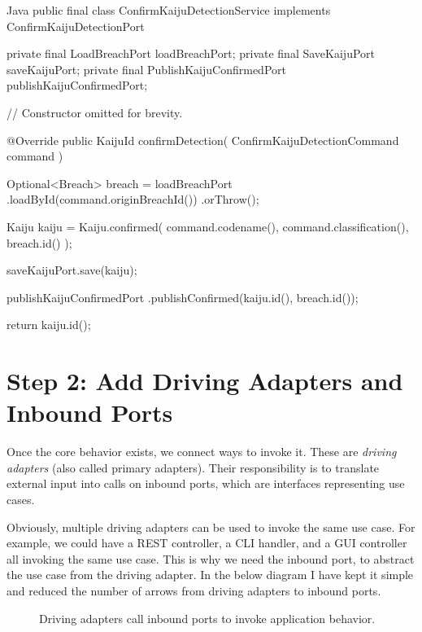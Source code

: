 \begin{ridercode}{Java}
public final class ConfirmKaijuDetectionService
    implements ConfirmKaijuDetectionPort
{
    private final LoadBreachPort loadBreachPort;
    private final SaveKaijuPort saveKaijuPort;
    private final PublishKaijuConfirmedPort
        publishKaijuConfirmedPort;

    // Constructor omitted for brevity.

    @Override
    public KaijuId confirmDetection(
        ConfirmKaijuDetectionCommand command
    )
    {
        Optional<Breach> breach = loadBreachPort
            .loadById(command.originBreachId())
            .orThrow();

        Kaiju kaiju = Kaiju.confirmed(
            command.codename(),
            command.classification(),
            breach.id()
        );

        saveKaijuPort.save(kaiju);

        publishKaijuConfirmedPort
            .publishConfirmed(kaiju.id(), breach.id());

        return kaiju.id();
    }
}
\end{ridercode}
\label{lst:confirm-detection-service}

\section{Step 2: Add Driving Adapters and Inbound Ports}
\label{sec:hexagonal_step2}

Once the core behavior exists, we connect ways to invoke it. These are \textit{driving adapters} (also called primary adapters). Their responsibility is to translate external input into calls on inbound ports, which are interfaces representing use cases. 

Obviously, multiple driving adapters can be used to invoke the same use case. For example, we could have a REST controller, a CLI handler, and a GUI controller all invoking the same use case. This is why we need the inbound port, to abstract the use case from the driving adapter. In the below diagram I have kept it simple and reduced the number of arrows from driving adapters to inbound ports.

\begin{figure}[htbp]
    \centering
    
    \caption{Driving adapters call inbound ports to invoke application behavior.}
    \label{fig:hexagonal_driving_adapters}
\end{figure}

